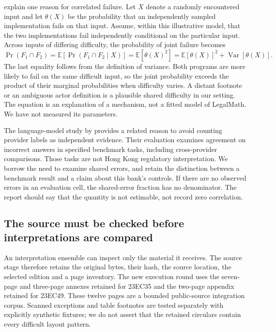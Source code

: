 \documentclass[12pt,a4paper,oneside,openany]{book}
\begin{document}
\citet[section 4.1]{littlewood2001diversity} explain one reason for correlated
failure. Let $X$ denote a randomly encountered input and let $\theta(X)$ be the
probability that an independently sampled implementation fails on that input.
Assume, within this illustrative model, that the two implementations fail
independently conditional on the particular input. Across inputs of differing
difficulty, the probability of joint failure becomes
\begin{equation}
 \Pr(F_1\cap F_2)
 = \mathbb{E}[\Pr(F_1\cap F_2\mid X)]
 = \mathbb{E}[\theta(X)^2]
 = \mathbb{E}[\theta(X)]^2+\operatorname{Var}[\theta(X)].
 \label{eq:round11-shared-difficulty}
\end{equation}
The last equality follows from the definition of variance. Both programs are
more likely to fail on the same difficult input, so the joint probability exceeds
the product of their marginal probabilities when difficulty varies. A distant
footnote or an ambiguous actor definition is a plausible shared difficulty in
our setting. The equation is an explanation of a mechanism, not a fitted model
of LegalMath. We have not measured its parameters.

The language-model study by \citet{kim2025correlated} provides a related reason
to avoid counting provider labels as independent evidence. Their evaluation
examines agreement on incorrect answers in specified benchmark tasks, including
cross-provider comparisons. Those tasks are not Hong Kong regulatory
interpretation. We borrow the need to examine shared errors, and retain the
distinction between a benchmark result and a claim about this bank's controls.
If there are no observed errors in an evaluation cell, the shared-error fraction
has no denominator. The report should say that the quantity is not estimable,
not record zero correlation.

\subsection{The source must be checked before interpretations are compared}

An interpretation ensemble can inspect only the material it receives. The source
stage therefore retains the original bytes, their hash, the source location,
the selected edition and a page inventory. The new execution round uses the
seven-page and three-page annexes retained for 23EC35 and the two-page appendix
retained for 23EC49. These twelve pages are a bounded public-source integration
corpus. Scanned exceptions and table footnotes are tested separately with
explicitly synthetic fixtures; we do not assert that the retained circulars
contain every difficult layout pattern.
\end{document}
